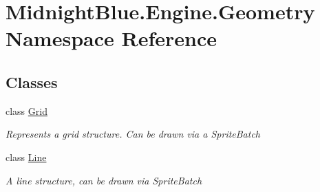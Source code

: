 \hypertarget{namespace_midnight_blue_1_1_engine_1_1_geometry}{}\section{Midnight\+Blue.\+Engine.\+Geometry Namespace Reference}
\label{namespace_midnight_blue_1_1_engine_1_1_geometry}
\subsection*{Classes}
\begin{DoxyCompactItemize}
\item 
class \hyperlink{class_midnight_blue_1_1_engine_1_1_geometry_1_1_grid}{Grid}
\begin{DoxyCompactList}\small\item\em Represents a grid structure. Can be drawn via a Sprite\+Batch \end{DoxyCompactList}\item 
class \hyperlink{class_midnight_blue_1_1_engine_1_1_geometry_1_1_line}{Line}
\begin{DoxyCompactList}\small\item\em A line structure, can be drawn via Sprite\+Batch \end{DoxyCompactList}\end{DoxyCompactItemize}
